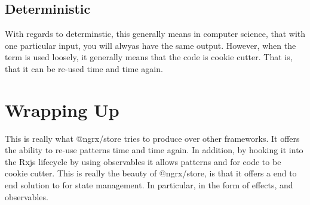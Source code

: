 \subsection{Deterministic}
With regards to determinstic, this generally means in computer science, that
with one particular input, you will alwyas have the same output. However, when
the term is used loosely, it generally means that the code is cookie cutter.
That is, that it can be re-used time and time again.

\section{Wrapping Up}
This is really what @ngrx/store tries to produce over other frameworks. It
offers the ability to re-use patterns time and time again. In addition, by
hooking it into the Rxjs lifecycle by using observables it allows patterns and
for code to be cookie cutter. This is really the beauty of @ngrx/store, is that
it offers a end to end solution to for state management. In particular, in the
form of effects, and observables.
